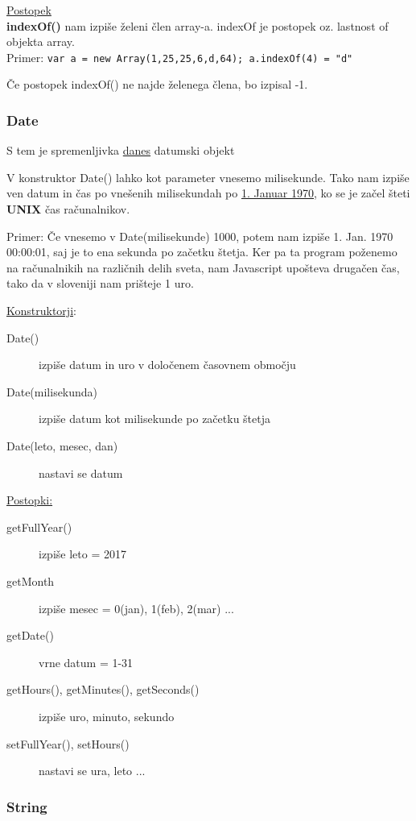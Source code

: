 \underline{Postopek}\\
\textbf{indexOf()} nam izpiše želeni člen array-a. indexOf je postopek oz. lastnost of objekta array.\\
Primer:
\texttt{var a = new Array(1,25,25,6,d,64); a.indexOf(4) = "d"}

Če postopek indexOf() ne najde želenega člena, bo izpisal -1.

\subsubsection*{Date}

{\centering{}\par} S tem je spremenljivka \underline{danes} datumski objekt

V konstruktor Date() lahko kot parameter vnesemo milisekunde. Tako nam izpiše ven datum in čas po vnešenih milisekundah po \underline{1. Januar 1970}, ko se je začel šteti \textbf{UNIX} čas računalnikov.

Primer: Če vnesemo v Date(milisekunde) 1000, potem nam izpiše 1. Jan. 1970 00:00:01, saj je to ena sekunda po začetku štetja. Ker pa ta program poženemo na računalnikih na različnih delih sveta, nam Javascript upošteva drugačen čas, tako da v sloveniji nam prišteje 1 uro.

\underline{Konstruktorji}:
\begin{description}
	\item[Date()] izpiše datum in uro v določenem časovnem območju
	\item[Date(milisekunda)] izpiše datum kot milisekunde po začetku štetja 
	\item[Date(leto, mesec, dan)] nastavi se datum
\end{description}
\newpage
\underline{Postopki:}
\begin{description}
	\item[getFullYear()] izpiše leto = 2017
	\item[getMonth] izpiše mesec = 0(jan), 1(feb), 2(mar) ...
	\item[getDate()] vrne datum = 1-31
	\item[getHours(), getMinutes(), getSeconds()] izpiše uro, minuto, sekundo
	\item[setFullYear(), setHours()] nastavi se ura, leto ...
\end{description}

\subsubsection*{String}


